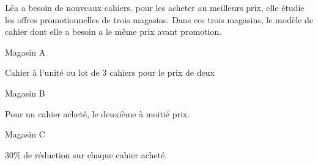 Léa a besoin de nouveaux cahiers. pour les acheter au meilleurs prix, elle étudie les offres promotionnelles de trois magasins. Dans ces trois magasins, le modèle de cahier dont elle a besoin a le même prix avant promotion.
\begin{multicols}{3}
\begin{bclogo}[couleur= gray!10,arrondi =0.1,cadreTitre=true]{Magasin A}
\begin{center}
Cahier à l'unité 
ou 
lot de 3 cahiers pour le prix de deux
\end{center}
\end{bclogo}

\begin{bclogo}[couleur= gray!10,arrondi =0.1,cadreTitre=true]{Magasin B}
\begin{center}
Pour un cahier acheté, le deuxième à moitié prix.
\end{center}
\end{bclogo}

\begin{bclogo}[couleur= gray!10,arrondi =0.1,cadreTitre=true]{Magasin C}
\begin{center}
30\%{} de réduction sur chaque cahier acheté.
\end{center}
\end{bclogo}
\end{multicols}

